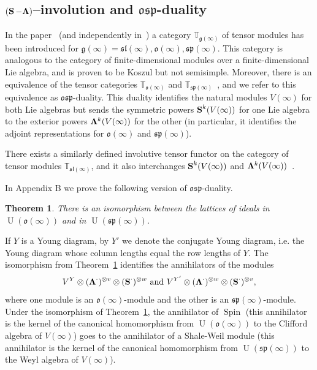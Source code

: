 \documentclass{emsprocart}
\newtheorem{theorem}{Theorem}[section]
\begin{document}
\subsection{$(\operatorname{\bf S}-{\bf \Lambda})$--involution and $\mathfrak{osp}$-duality} In the paper~\cite{DPS} (and independently in~\cite{SSn}) a category $\mathbb T_{\mathfrak g(\infty)}$ of tensor modules has been introduced for $\mathfrak g(\infty)=\mathfrak{sl}(\infty), \mathfrak o(\infty), \mathfrak{sp}(\infty)$. This category is analogous to the category of finite-dimensional modules over a finite-dimensional Lie algebra, and is proven to be Koszul but not semisimple.  Moreover, there is an equivalence of the tensor categories $\mathbb T_{\mathfrak{o}(\infty)}$ and $\mathbb T_{\mathfrak{sp}(\infty)}$~\cite{DPS, SSn, S}, and we refer to this equivalence as $\mathfrak{osp}$-duality. This duality identifies the natural modules $V(\infty)$ for both Lie algebras but sends the symmetric powers $\operatorname{\bf S}^k(V(\infty))$ for one Lie algebra to the exterior powers ${\bf \Lambda}^k(V(\infty))$ for the other (in particular, it identifies the adjoint representations for $\mathfrak{o}(\infty)$ and $\mathfrak{sp}(\infty)$).

There exists a similarly defined involutive tensor functor on the category of tensor modules $\mathbb T_{\mathfrak{sl}(\infty)}$, and it also interchanges $\operatorname{\bf S}^k(V(\infty))$ and ${\bf \Lambda}^k(V(\infty))$~\cite{S}. %

In Appendix B we prove the following version of $\mathfrak{osp}$-duality.
\begin{theorem}\label{Tilosp}\label{T49}There is an isomorphism between the lattices of ideals in $\operatorname{U}(\mathfrak{o}(\infty))$ and in $\operatorname{U}(\mathfrak{sp}(\infty))$.\end{theorem}


If $Y$ is a Young diagram, by $Y'$ we denote the conjugate Young diagram, i.e. the Young diagram whose column lengths equal the row lengths of $Y$. The isomorphism from Theorem~\ref{Tilosp} identifies the annihilators of the modules
$$V^{Y}\otimes({\bf \Lambda}^\cdot)^{\otimes v}\otimes(\operatorname{\bf S}^\cdot)^{\otimes w}\mbox{~and~}V^{Y'}\otimes({\bf \Lambda}^\cdot)^{\otimes w}\otimes (\operatorname{\bf S}^\cdot)^{\otimes v},$$
where one module is an $\mathfrak o(\infty)$-module and the other is an $\mathfrak{sp}(\infty)$-module.
Under the isomorphism of Theorem~\ref{Tilosp}, the annihilator of $\operatorname{Spin}$ (this annihilator is the kernel of the canonical homomorphism from $\operatorname{U}(\mathfrak o(\infty))$ to the Clifford algebra of $V(\infty)$) goes to the annihilator of a Shale-Weil module (this annihilator is the kernel of the canonical homomorphism from $\operatorname{U}(\mathfrak{sp}(\infty))$ to the Weyl algebra of $V(\infty)$).
\end{document}
